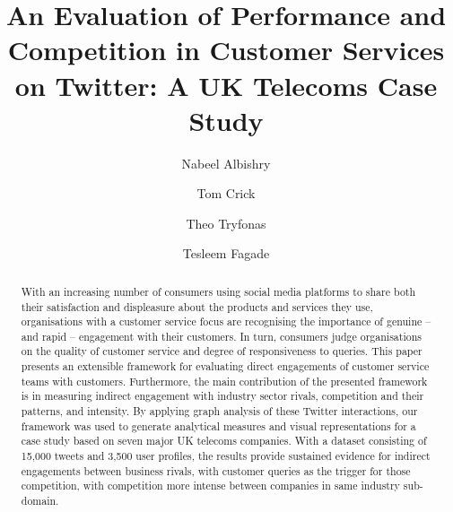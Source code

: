 \documentclass[sigconf]{acmart}
\begin{document}
\title[An Evaluation of Performance and Competition in Customer Services on
  Twitter]{An Evaluation of Performance and Competition in Customer Services on
  Twitter: A UK Telecoms Case Study}

\author{Nabeel Albishry}

\author{Tom Crick}

\author{Theo Tryfonas}

\author{Tesleem Fagade}


 
\renewcommand{\shortauthors}{Albishry, Crick, Tryfonas, and Fagade}


\begin{abstract}
With an increasing number of consumers using social media platforms to
share both their satisfaction and displeasure about the products and
services they use, organisations with a customer service focus are
recognising the importance of genuine -- and rapid -- engagement with
their customers. In turn, consumers judge organisations on the quality
of customer service and degree of responsiveness to queries. This
paper presents an extensible framework for evaluating direct
engagements of customer service teams with customers. Furthermore, 
the main contribution of the presented framework is in measuring indirect 
engagement with industry sector rivals, competition
and their patterns, and intensity. By applying graph analysis of these
Twitter interactions, our framework was used to generate analytical
measures and visual representations for a case study based on seven
major UK telecoms companies. With a dataset consisting of 15,000
tweets and 3,500 user profiles, the results provide sustained evidence
for indirect engagements between business rivals, with customer
queries as the trigger for those competition, with competition more
intense between companies in same industry sub-domain.
\end{abstract}
\end{document}
